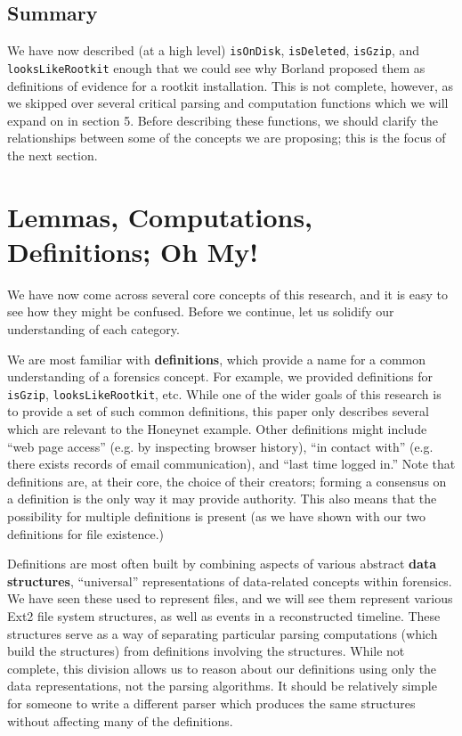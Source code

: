 \documentclass[nocopyrightspace]{sigplanconf}
\begin{document}
\subsection{Summary}

We have now described (at a high level) {\tt isOnDisk}, {\tt isDeleted},
{\tt isGzip}, and {\tt looksLikeRootkit} enough that we could see why Borland
proposed them as definitions of evidence for a rootkit installation. This is
not complete, however, as we skipped over several critical parsing and
computation functions which we will expand on in section 5. Before describing
these functions, we should clarify the relationships between some of the
concepts we are proposing; this is the focus of the next section.

\section{Lemmas, Computations, Definitions; Oh My!}

We have now come across several core concepts of this research, and it is easy
to see how they might be confused. Before we continue, let us solidify our
understanding of each category.

We are most familiar with {\bf definitions}, which provide a name for a common
understanding of a forensics concept. For example, we provided definitions for
{\tt isGzip}, {\tt looksLikeRootkit}, etc. While one of the wider goals of
this research is to provide a set of such common definitions, this paper only
describes several which are relevant to the Honeynet example. Other
definitions might include ``web page access'' (e.g. by inspecting browser
history), ``in contact with'' (e.g. there exists records of email
communication), and ``last time logged in.'' Note that definitions are, at
their core, the choice of their creators; forming a consensus on a definition
is the only way it may provide authority. This also means that the possibility
for multiple definitions is present (as we have shown with our two definitions
for file existence.)

Definitions are most often built by combining aspects of various abstract {\bf
data structures}, ``universal'' representations of data-related concepts
within forensics. We have seen these used to represent files, and we will see
them represent various Ext2 file system structures, as well as events in a
reconstructed timeline. These structures serve as a way of separating
particular parsing computations (which build the structures) from definitions
involving the structures. While not complete, this division allows us to
reason about our definitions using only the data representations, not the
parsing algorithms. It should be relatively simple for someone to write a
different parser which produces the same structures without affecting many of
the definitions.
\end{document}
